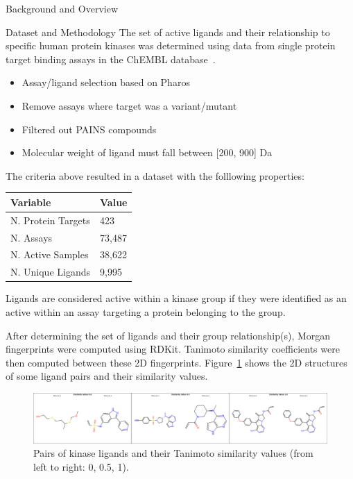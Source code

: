 \documentclass[final]{beamer}
\newlength{\colwidth}
\begin{document}
\begin{frame}[t]
\begin{columns}[t]
\begin{column}{\colwidth}
\begin{block}{Background and Overview}
  \end{block}

  \begin{block}{Dataset and Methodology}
    \small
    The set of active ligands and their relationship to specific human protein kinases was determined using data from single protein target binding assays in the ChEMBL database~\cite{chembl_db_2023}. 
    \begin{itemize}
        \item Assay/ligand selection based on Pharos~\cite{pharos_2022}
        \item Remove assays where target was a variant/mutant
        \item Filtered out PAINS compounds~\cite{baell_holloway_2010}
        \item Molecular weight of ligand must fall between [200, 900] Da
    \end{itemize}

    The criteria above resulted in a dataset with the folllowing properties:

    \begin{table}[!ht]
    \centering
    \small
    \begin{tabular}{l|l}
        \hline
        \textbf{Variable} & \textbf{Value} \\ \hline
        N. Protein Targets & 423 \\ \hline
        N. Assays & 73,487 \\ \hline
        N. Active Samples & 38,622 \\ \hline
        N. Unique Ligands & 9,995 \\ \hline
    \end{tabular}
    \end{table}

    Ligands are considered active within a kinase group if they were identified as an active within an assay targeting a protein belonging to the group. 

    After determining the set of ligands and their group relationship(s), Morgan fingerprints were computed using RDKit. Tanimoto similarity coefficients were then computed between these 2D fingerprints. Figure~\ref{ligand_sim} shows the 2D structures of some ligand pairs and their similarity values.
\begin{figure}
    \centering
    \includegraphics[width=\textwidth]{../figures/ligand_sim.png}
    \caption{Pairs of kinase ligands and their Tanimoto similarity values (from left to right: 0, 0.5, 1).}
    \label{ligand_sim}
\end{figure}


\end{block}
\end{column}
\end{columns}
\end{frame}
\end{document}
